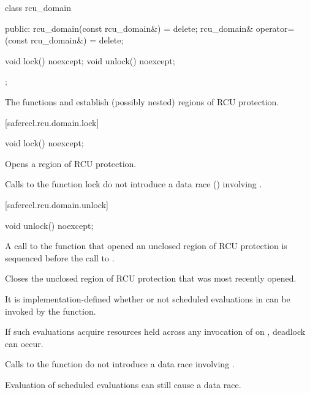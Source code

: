 \begin{codeblock}
class rcu_domain {
public:
  rcu_domain(const rcu_domain&) = delete;
  rcu_domain& operator=(const rcu_domain&) = delete;

  void lock() noexcept;
  void unlock() noexcept;
};
\end{codeblock}

The functions  and  establish (possibly nested)
regions of RCU protection.

[saferecl.rcu.domain.lock]{}

\begin{itemdecl}
void lock() noexcept;
\end{itemdecl}

\begin{itemdescr}

\effects
Opens a region of RCU protection.

\remarks
Calls to the function lock do not introduce a data race
() involving .

\end{itemdescr}

[saferecl.rcu.domain.unlock]{}

\begin{itemdecl}
void unlock() noexcept;
\end{itemdecl}

\begin{itemdescr}

\expects
A call to the function  that opened
an unclosed region of RCU protection is sequenced before the
call to .

\effects
Closes the unclosed region of RCU protection that was
most recently opened.

\remarks
It is implementation-defined whether or not scheduled
evaluations in  can be invoked by the 
function.
\begin{note}
If such evaluations acquire resources held across any invocation
of  on , deadlock can occur.\end{note}
Calls to the function  do not introduce a data race
involving .
\begin{note}
Evaluation of scheduled evaluations can still cause a data race.\end{note}

\end{itemdescr}

